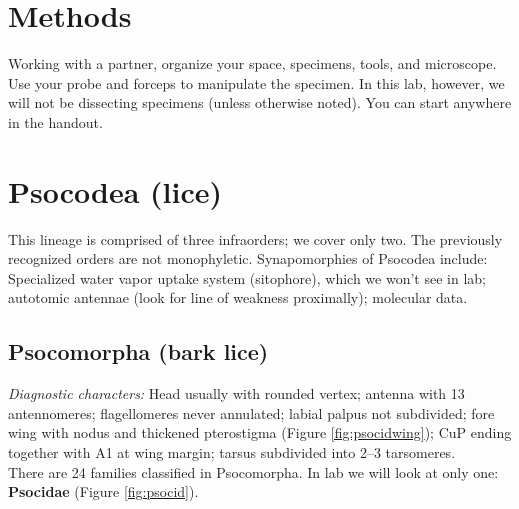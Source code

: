 \documentclass[letterpaper, 11pt]{article}
\begin{document}
\section*{Methods}
Working with a partner, organize your space, specimens, tools, and microscope. Use your probe and forceps to manipulate the specimen. In this lab, however, we will not be dissecting specimens (unless otherwise noted). You can start anywhere in the handout.

\section{Psocodea (lice)}
This lineage is comprised of three infraorders; we cover only two. The previously recognized orders are not monophyletic. Synapomorphies of Psocodea include: Specialized water vapor uptake system (sitophore), which we won't see in lab; autotomic antennae (look for line of weakness proximally); molecular data.\\

\subsection{Psocomorpha (bark lice)}
\noindent{}\textit{Diagnostic characters:} Head usually with rounded vertex; antenna with 13 antennomeres; flagellomeres never annulated; labial palpus not subdivided; fore wing with nodus and thickened pterostigma (Figure \ref{fig:psocidwing}); CuP ending together with A1 at wing margin; tarsus subdivided into 2--3 tarsomeres.\\

\noindent{}There are 24 families classified in Psocomorpha. In lab we will look at only one: \textbf{Psocidae} (Figure \ref{fig:psocid}).
\end{document}
